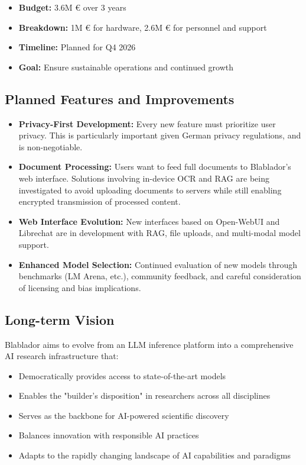 \documentclass[10pt,conference]{IEEEtran}
\begin{document}
\begin{itemize}
    \item \textbf{Budget:} 3.6M € over 3 years
    \item \textbf{Breakdown:} 1M € for hardware, 2.6M € for personnel and support
    \item \textbf{Timeline:} Planned for Q4 2026
    \item \textbf{Goal:} Ensure sustainable operations and continued growth
\end{itemize}

\subsection{Planned Features and Improvements}
\begin{itemize}
    \item \textbf{Privacy-First Development:} Every new feature must prioritize user privacy. This is particularly important given German privacy regulations, and is non-negotiable.
    
    \item \textbf{Document Processing:} Users want to feed full documents to Blablador's web interface. Solutions involving in-device OCR and RAG are being investigated to avoid uploading documents to servers while still enabling encrypted transmission of processed content.
    
    \item \textbf{Web Interface Evolution:} New interfaces based on Open-WebUI and Librechat are in development with RAG, file uploads, and multi-modal model support.
    
    \item \textbf{Enhanced Model Selection:} Continued evaluation of new models through benchmarks (LM Arena, etc.), community feedback, and careful consideration of licensing and bias implications.
\end{itemize}

\subsection{Long-term Vision}
Blablador aims to evolve from an LLM inference platform into a comprehensive AI research infrastructure that:
\begin{itemize}
    \item Democratically provides access to state-of-the-art models
    \item Enables the "builder's disposition" in researchers across all disciplines
    \item Serves as the backbone for AI-powered scientific discovery
    \item Balances innovation with responsible AI practices
    \item Adapts to the rapidly changing landscape of AI capabilities and paradigms
\end{itemize}
\end{document}
